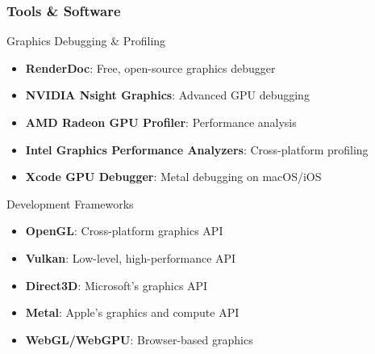 \begin{frame}
\frametitle{Tools \& Software}

\begin{mathbox}{Graphics Debugging \& Profiling}
\begin{itemize}
    \item \textbf{RenderDoc}: Free, open-source graphics debugger
    \item \textbf{NVIDIA Nsight Graphics}: Advanced GPU debugging
    \item \textbf{AMD Radeon GPU Profiler}: Performance analysis
    \item \textbf{Intel Graphics Performance Analyzers}: Cross-platform profiling
    \item \textbf{Xcode GPU Debugger}: Metal debugging on macOS/iOS
\end{itemize}
\end{mathbox}

\begin{conceptbox}{Development Frameworks}
\begin{itemize}
    \item \textbf{OpenGL}: Cross-platform graphics API
    \item \textbf{Vulkan}: Low-level, high-performance API
    \item \textbf{Direct3D}: Microsoft's graphics API
    \item \textbf{Metal}: Apple's graphics and compute API
    \item \textbf{WebGL/WebGPU}: Browser-based graphics
\end{itemize}
\end{conceptbox}

\end{frame}

